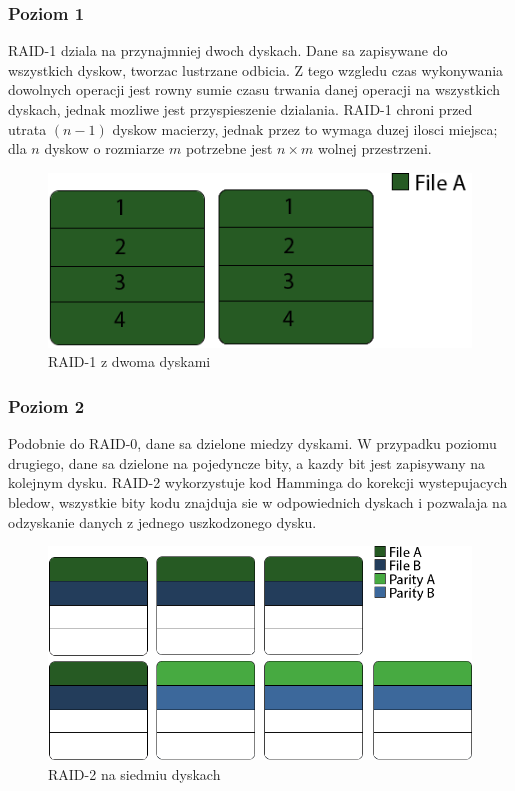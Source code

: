 \subsubsection{Poziom 1}
RAID-1 dziala na przynajmniej dwoch dyskach. Dane sa zapisywane do wszystkich dyskow, tworzac lustrzane odbicia. Z tego wzgledu czas wykonywania dowolnych operacji jest rowny sumie czasu trwania danej operacji na wszystkich dyskach, jednak mozliwe jest przyspieszenie dzialania. RAID-1 chroni przed utrata $(n-1)$ dyskow macierzy, jednak przez to wymaga duzej ilosci miejsca; dla $n$ dyskow o rozmiarze $m$ potrzebne jest $n\times m$ wolnej przestrzeni.
\begin{figure}[h!]
        \centering
        \includegraphics[scale=0.8]{raid-1.png}
        \caption{RAID-1 z dwoma dyskami}
        \label{fig:raid1}
\end{figure}
\subsubsection{Poziom 2}
Podobnie do RAID-0, dane sa dzielone miedzy dyskami. W przypadku poziomu drugiego, dane sa dzielone na pojedyncze bity, a kazdy bit jest zapisywany na kolejnym dysku. RAID-2 wykorzystuje kod Hamminga do korekcji wystepujacych bledow, wszystkie bity kodu znajduja sie w odpowiednich dyskach i  pozwalaja na odzyskanie danych z jednego uszkodzonego dysku. 
\begin{figure}[h!tb]
        \centering
        \includegraphics[scale=0.8]{raid-2.png}
        \caption{RAID-2 na siedmiu dyskach}
        \label{fig:raid2}
\end{figure}
